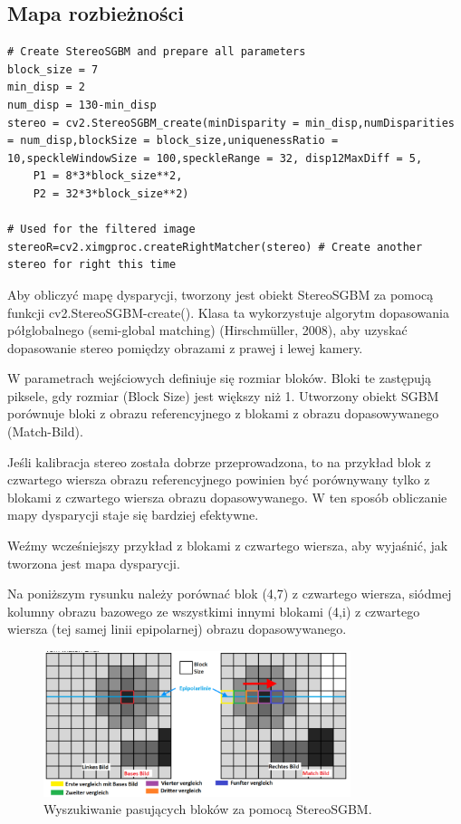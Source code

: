 \documentclass[magisterska]{pracadypl}
\begin{document}
\subsection{Mapa rozbieżności}

\begin{lstlisting}[style=mypython]
# Create StereoSGBM and prepare all parameters
block_size = 7
min_disp = 2
num_disp = 130-min_disp
stereo = cv2.StereoSGBM_create(minDisparity = min_disp,numDisparities = num_disp,blockSize = block_size,uniquenessRatio = 10,speckleWindowSize = 100,speckleRange = 32, disp12MaxDiff = 5,
    P1 = 8*3*block_size**2,
    P2 = 32*3*block_size**2)

# Used for the filtered image
stereoR=cv2.ximgproc.createRightMatcher(stereo) # Create another stereo for right this time
\end{lstlisting}

Aby obliczyć mapę dysparycji, tworzony jest obiekt StereoSGBM za pomocą funkcji cv2.StereoSGBM-create(). Klasa ta wykorzystuje algorytm dopasowania półglobalnego (semi-global matching) (Hirschmüller, 2008), aby uzyskać dopasowanie stereo pomiędzy obrazami z prawej i lewej kamery.

W parametrach wejściowych definiuje się rozmiar bloków. Bloki te zastępują piksele, gdy rozmiar (Block Size) jest większy niż 1. Utworzony obiekt SGBM porównuje bloki z obrazu referencyjnego z blokami z obrazu dopasowywanego (Match-Bild).

Jeśli kalibracja stereo została dobrze przeprowadzona, to na przykład blok z czwartego wiersza obrazu referencyjnego powinien być porównywany tylko z blokami z czwartego wiersza obrazu dopasowywanego. W ten sposób obliczanie mapy dysparycji staje się bardziej efektywne.

Weźmy wcześniejszy przykład z blokami z czwartego wiersza, aby wyjaśnić, jak tworzona jest mapa dysparycji.

Na poniższym rysunku należy porównać blok (4,7) z czwartego wiersza, siódmej kolumny obrazu bazowego ze wszystkimi innymi blokami (4,i) z czwartego wiersza (tej samej linii epipolarnej) obrazu dopasowywanego.

\begin{figure}[H]  %
    \centering  %
    \includegraphics[width=0.8\textwidth]{images/dopracy1.png}  %
    \captionsetup{font=footnotesize}
    \caption[Wyszukiwanie pasujących bloków za pomocą StereoSGBM. Opracowanie własne. ]{Wyszukiwanie pasujących bloków za pomocą StereoSGBM.}
\end{figure}
\end{document}
